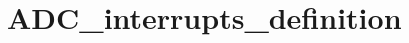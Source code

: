 \hypertarget{group___a_d_c__interrupts__definition}{\section{A\-D\-C\-\_\-interrupts\-\_\-definition}
\label{group___a_d_c__interrupts__definition}
}
